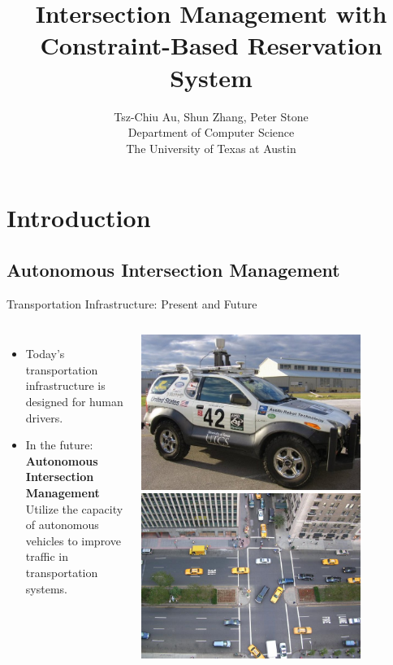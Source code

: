 \documentclass{beamer}
\title{Intersection Management with Constraint-Based Reservation
System}
\author{Tsz-Chiu Au, Shun Zhang, Peter Stone\\ Department of Computer
Science\\ The University of Texas at Austin}
\begin{document}
\begin{frame}
\titlepage
\end{frame}

\section{Introduction}

\subsection{Autonomous Intersection Management}

\begin{frame}{Transportation Infrastructure: Present and Future}
\begin{columns}[c]
		\begin{itemize}
		\item Today’s transportation infrastructure is designed for
		human drivers.\pause
		\item In the future: \textbf{Autonomous Intersection
		Management}\\
		Utilize the capacity of autonomous vehicles to improve traffic
		in transportation systems.
		\end{itemize}
		
		\includegraphics[width=0.8\textwidth]{42.png}
		\hfill
		\includegraphics[width=0.8\textwidth]{intersection.jpg}
\end{columns}
\end{frame}
\end{document}
